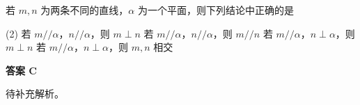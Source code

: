 \begin{choice}[source={2024年天津卷选择题\#6}, topic={线面平行与垂直}]
若 $m,n$ 为两条不同的直线，$\alpha$ 为一个平面，则下列结论中正确的是
\begin{tasks}(2)
	\task 若 $m//\alpha$，$n//\alpha$，则 $m\perp n$
	\task 若 $m//\alpha$，$n//\alpha$，则 $m//n$
	\task 若 $m//\alpha$，$n\perp\alpha$，则 $m\perp n$
	\task 若 $m//\alpha$，$n\perp\alpha$，则 $m,n$ 相交
\end{tasks}
\end{choice}
\begin{choice-sol}
\textbf{答案 C}

待补充解析。
\end{choice-sol}

